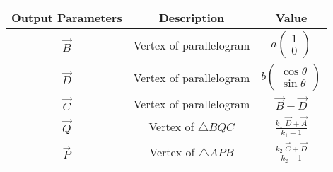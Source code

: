 \begin{tabular}{|c|c|c|}
\hline
    \textbf{Output Parameters} &\textbf{Description} &\textbf{Value} \\
    \hline
     $\vec{B}$ &Vertex of parallelogram&$a\begin{pmatrix}
     1\\0
     \end{pmatrix}$\\
      \hline
     $\vec{D}$ &Vertex of parallelogram &$b\begin{pmatrix} \cos{\theta}\\\sin{\theta}
     \end{pmatrix}$\\
     \hline
     $\vec{C}$&Vertex of parallelogram&$\vec{B}+\vec{D}$\\
     \hline
      $\vec{ Q}$ &Vertex of $\triangle BQC$&$\frac{k_1.\vec{D}+\vec{A}}{k_1+1}$\\
     \hline
      $\vec{P}$ &Vertex of $\triangle APB$&$\frac{k_2.\vec{C}+\vec{D}}{k_2+1}$\\
   \hline
\end{tabular}
